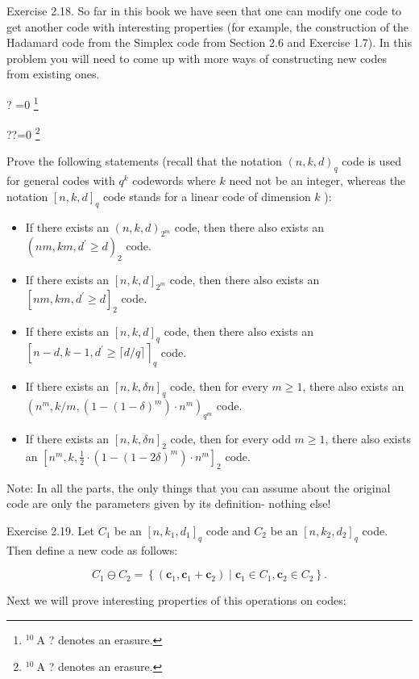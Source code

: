 \documentclass[10pt]{article}
\let\svthefootnote\thefootnote
\newcommand\blfootnotetext[1]{%
  \let\thefootnote\relax\footnote{#1}%
  \addtocounter{footnote}{-1}%
  \let\thefootnote\svthefootnote%
}
\let\svfootnotetext\footnotetext
\renewcommand\footnotetext[2][?]{%
  \if\relax#1\relax%
    \ifnum\value{footnote}=0\blfootnotetext{#2}\else\svfootnotetext{#2}\fi%
  \else%
    \if?#1\ifnum\value{footnote}=0\blfootnotetext{#2}\else\svfootnotetext{#2}\fi%
    \else\svfootnotetext[#1]{#2}\fi%
  \fi
}
\begin{document}
Exercise 2.18. So far in this book we have seen that one can modify one code to get another code with interesting properties (for example, the construction of the Hadamard code from the Simplex code from Section 2.6 and Exercise 1.7). In this problem you will need to come up with more ways of constructing new codes from existing ones.

Prove the following statements (recall that the notation $(n, k, d)_{q}$ code is used for general codes with $q^{k}$ codewords where $k$ need not be an integer, whereas the notation $[n, k, d]_{q}$ code stands for a linear code of dimension $k$ ):

\begin{itemize}
  \item[1.] If there exists an $(n, k, d)_{2^{m}}$ code, then there also exists an $\left(n m, k m, d^{\prime} \geq d\right)_{2}$ code.
  \item[2.] If there exists an $[n, k, d]_{2^{m}}$ code, then there also exists an $\left[n m, k m, d^{\prime} \geq d\right]_{2}$ code.
  \item[3.] If there exists an $[n, k, d]_{q}$ code, then there also exists an $\left[n-d, k-1, d^{\prime} \geq\lceil d / q\rceil\right\rceil_{q}$ code.
  \item[4.] If there exists an $[n, k, \delta n]_{q}$ code, then for every $m \geq 1$, there also exists an $\left(n^{m}, k / m,\left(1-(1-\delta)^{m}\right) \cdot n^{m}\right)_{q^{m}}$ code.
  \item[5.] If there exists an $[n, k, \delta n]_{2}$ code, then for every odd $m \geq 1$, there also exists an $\left[n^{m}, k, \frac{1}{2} \cdot\left(1-(1-2 \delta)^{m}\right) \cdot n^{m}\right]_{2}$ code.
\end{itemize}

Note: In all the parts, the only things that you can assume about the original code are only the parameters given by its definition- nothing else!

Exercise 2.19. Let $C_{1}$ be an $\left[n, k_{1}, d_{1}\right]_{q}$ code and $C_{2}$ be an $\left[n, k_{2}, d_{2}\right]_{q}$ code. Then define a new code as follows:

$$
C_{1} \ominus C_{2}=\left\{\left(\mathbf{c}_{1}, \mathbf{c}_{1}+\mathbf{c}_{2}\right) \mid \mathbf{c}_{1} \in C_{1}, \mathbf{c}_{2} \in C_{2}\right\} .
$$

Next we will prove interesting properties of this operations on codes:
\end{document}
